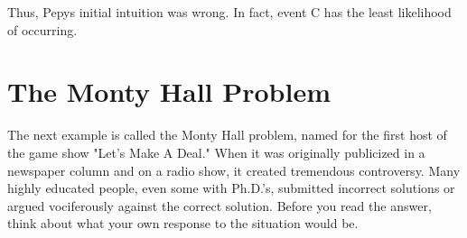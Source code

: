 \documentclass[11pt,a4paper]{book}
\begin{document}
\begin{example}
Thus, Pepys initial intuition was wrong. In fact, event C has the least likelihood of occurring.
\end{example}

\newpage{}

\section{The Monty Hall Problem}

The next example is called the Monty Hall problem, named for the first
host of the game show "Let's Make A Deal." When it was originally publicized in a newspaper column and on a radio show, it created tremendous controversy.
Many highly educated people, even some with Ph.D.\textquoteright s,
submitted incorrect solutions or argued vociferously against the correct solution. Before you read the answer, think about what your own response to the situation would be.
\end{document}
